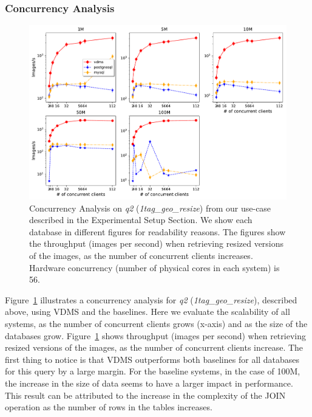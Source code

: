 
\subsubsection{Concurrency Analysis} \label{concurrency_analysis}

\begin{figure}[ht]
\includegraphics[width=\columnwidth]{figures/plot_conc_q_1tag_geo_resize_mosaic_results_throughput_db_size}
\caption{Concurrency Analysis on \textit{q2} (\textit{1tag\_geo\_resize}) from our use-case
described in the Experimental Setup Section.
We show each database in different figures for readability reasons.
The figures show the throughput (images per second) when retrieving
resized versions of the images, as the number of concurrent clients increases.
Hardware concurrency (number of physical cores in each system)
is 56.}
\label{fig:concurrency_comparison_q2}
\end{figure}

Figure~\ref{fig:concurrency_comparison_q2} illustrates a concurrency analysis for
\textit{q2} (\textit{1tag\_geo\_resize}), described above,
using VDMS and the baselines.
Here we evaluate the scalability of all systems, as the number of concurrent
clients grows (x-axis) and as the size of the databases grow.
Figure~\ref{fig:concurrency_comparison_q2} shows throughput (images per second)
when retrieving resized versions of the images, as the number of
concurrent clients increase.
The first thing to notice is that VDMS outperforms both baselines for all
databases for this query by a large margin.
For the baseline systems, in the case of 100M, the increase in the
size of data seems to have a larger impact in performance.
This result can be attributed to the increase in the complexity of the JOIN
operation as the number of rows in the tables increases.

